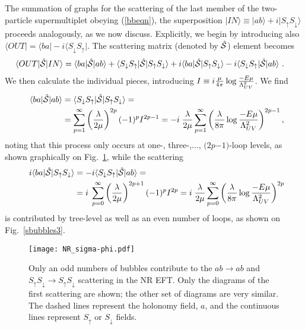 \documentclass[11pt]{article}
\begin{document}
The summation of graphs for the scattering of the last member of the two-particle supermultiplet obeying (\ref{bbeqn}), the  superposition  $|IN \rangle \equiv | a b \rangle + i |S_{\uparrow} S_{\downarrow} \rangle$ proceeds analogously, as we now discuss. Explicitly, we begin by introducing also $\langle OUT| = \langle {b a} | - i \langle S_\downarrow S_\uparrow  |$. The scattering matrix (denoted by $\hat {\cal{S}}$) element becomes
\begin{align} \label{mixed2}
  \langle OUT| \hat  {\cal{S}} |IN\rangle   
&= \langle ba| \hat  {\cal{S}}|ab\rangle + \langle S_\downarrow S_\uparrow | \hat  {\cal{S}}|S_\uparrow  S_\downarrow \rangle 
+ i  \langle ba| \hat  {\cal{S}}|S_\uparrow S_\downarrow   \rangle - i \langle S_\downarrow    S_\uparrow | \hat  {\cal{S}}|ab\rangle    ~.
\end{align}
We then calculate the individual pieces, introducing $I \equiv i {\mu \over 4 \pi} \log {- E \mu \over \Lambda_{UV}^2}$. We find 
\begin{align}\label{sums}
 ~~ \langle ba| \hat  {\cal{S}}|ab\rangle &=    \langle S_\downarrow S_\uparrow | \hat  {\cal{S}}| S_\uparrow S_\downarrow    \rangle\nonumber =\\
 & = \sum\limits_{p=1}^\infty  \left( {\lambda \over 2 \mu} \right)^{2p}   (-1)^p I^{2 p - 1} =    
 -i  \;{\lambda \over 2 \mu} \sum\limits_{p=1}^\infty  \left( {\lambda \over    8 \pi}\log {- E \mu \over \Lambda_{UV}^2}\right)^{2 p - 1}, \end{align}
noting that this process only occurs at one-, three-,..., $(2p$$-$$1)$-loop levels, as shown graphically on Fig.~\ref{sbubbles2}, while the scattering
 \begin{align}
  ~~ i  \langle ba| \hat  {\cal{S}}|S_\uparrow S_\downarrow    \rangle    &= - i \langle S_\downarrow S_\uparrow  | \hat  {\cal{S}}| ab\rangle   
 =\nonumber \\
&= i \; \sum\limits_{p=0}^\infty \left({\lambda \over 2 \mu}\right)^{2p+1} (-1)^p I^{2 p}=  i \; {\lambda \over 2\mu} \sum\limits_{p=0}^\infty \left({\lambda \over 8   \pi}\log {- E \mu \over \Lambda_{UV}^2}\right)^{2 p   }  \label{sums2} 
\end{align}
is contributed by tree-level as well as an even number of loops, as shown on Fig.~\ref{sbubbles3}.
\begin{figure}[t] %
   \centering
   \texttt{[image: NR\_sigma-phi.pdf]} 
   \caption{Only an odd numbers of bubbles contribute to the $ab \rightarrow ab$ and $S_\uparrow S_\downarrow \rightarrow S_\uparrow S_\downarrow$ scattering in the NR EFT. Only the diagrams of the first scattering are shown; the other set of diagrams are very similar. The dashed lines represent the holonomy field, $a$, and the continuous lines represent $S_\uparrow$  or $S_\downarrow$ fields.}
	\label{sbubbles2}
\end{figure}
\end{document}
